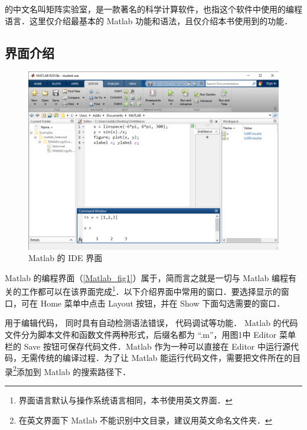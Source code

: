 
的中文名叫矩阵实验室，是一款著名的科学计算软件，也指这个软件中使用的编程语言．这里仅介绍最基本的 Matlab 功能和语法，且仅介绍本书使用到的功能．


\subsection{界面介绍}

\begin{figure}[ht]
\centering
\includegraphics[width= 14cm]{./figures/Matlab1.png}
\caption{Matlab 的 IDE 界面}\label{Matlab_fig1}
\end{figure}

Matlab 的编程界面（\autoref{Matlab_fig1}）属于，简而言之就是一切与 Matlab 编程有关的工作都可以在该界面完成\footnote{界面语言默认与操作系统语言相同，本书使用英文界面．}．以下介绍界面中常用的窗口．要选择显示的窗口，可在 Home 菜单中点击 Layout 按钮，并在 Show 下面勾选需要的窗口．

 用于编辑代码， 同时具有自动检测语法错误， 代码调试等功能． Matlab 的代码文件分为脚本文件和函数文件两种形式，后缀名都为 “.m”，用图1中 Editor 菜单栏的 Save 按钮可保存代码文件．Matlab 作为一种可以直接在 Editor 中运行源代码，无需传统的编译过程．为了让 Matlab 能运行代码文件，需要把文件所在的目录\footnote{在英文界面下 Matlab 不能识别中文目录，建议用英文命名文件夹．}添加到 Matlab 的搜索路径下．

